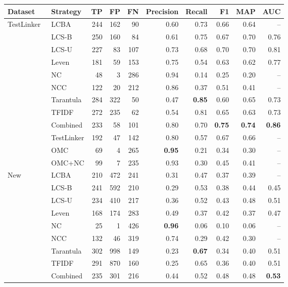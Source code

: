 \begin{tabular}{llrrrrrrrr}
\toprule
\textbf{Dataset} & \textbf{Strategy} & \textbf{TP} & \textbf{FP} &
\textbf{FN} & \textbf{Precision} & \textbf{Recall} & \textbf{F1} &
\textbf{MAP} & \textbf{AUC} \\
\midrule
\multirow{12}{*}{TestLinker~\cite{sun_method-level_2024}} & LCBA & 244 & 162 & 90 & 0.60 & 0.73 & 0.66 & 0.64 & -- \\
 & LCS-B & 250 & 160 & 84 & 0.61 & 0.75 & 0.67 & 0.70 & 0.76 \\
 & LCS-U & 227 & 83 & 107 & 0.73 & 0.68 & 0.70 & 0.70 & 0.81 \\
 & Leven & 181 & 59 & 153 & 0.75 & 0.54 & 0.63 & 0.62 & 0.77 \\
 & NC & 48 & 3 & 286 & 0.94 & 0.14 & 0.25 & 0.20 & -- \\
 & NCC & 122 & 20 & 212 & 0.86 & 0.37 & 0.51 & 0.41 & -- \\
 & Tarantula & 284 & 322 & 50 & 0.47 & \textbf{0.85} & 0.60 & 0.65 & 0.73 \\
 & TFIDF & 272 & 235 & 62 & 0.54 & 0.81 & 0.65 & 0.63 & 0.73 \\
 & Combined & 233 & 58 & 101 & 0.80 & 0.70 & \textbf{0.75} & \textbf{0.74} & \textbf{0.86} \\
 & TestLinker & 192 & 47 & 142 & 0.80 & 0.57 & 0.67 & 0.66 & -- \\
 & OMC & 69 & 4 & 265 & \textbf{0.95} & 0.21 & 0.34 & 0.30 & -- \\
 & OMC+NC & 99 & 7 & 235 & 0.93 & 0.30 & 0.45 & 0.41 & -- \\
\midrule
\multirow{12}{*}{New} & LCBA & 210 & 472 & 241 & 0.31 & 0.47 & 0.37 & 0.39 & -- \\
 & LCS-B & 241 & 592 & 210 & 0.29 & 0.53 & 0.38 & 0.44 & 0.45 \\
 & LCS-U & 234 & 410 & 217 & 0.36 & 0.52 & 0.43 & 0.48 & 0.51 \\
 & Leven & 168 & 174 & 283 & 0.49 & 0.37 & 0.42 & 0.37 & 0.47 \\
 & NC & 25 & 1 & 426 & \textbf{0.96} & 0.06 & 0.10 & 0.06 & -- \\
 & NCC & 132 & 46 & 319 & 0.74 & 0.29 & 0.42 & 0.30 & -- \\
 & Tarantula & 302 & 998 & 149 & 0.23 & \textbf{0.67} & 0.34 & 0.40 & 0.51 \\
 & TFIDF & 291 & 870 & 160 & 0.25 & 0.65 & 0.36 & 0.40 & 0.51 \\
 & Combined & 235 & 301 & 216 & 0.44 & 0.52 & 0.48 & 0.48 & \textbf{0.53} \\

\end{tabular}
